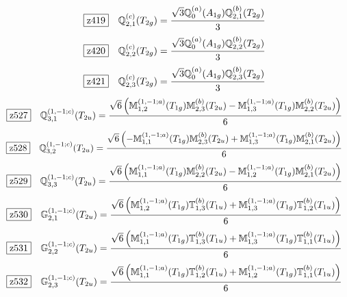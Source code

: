 \documentclass[fleqn,10pt,landscape]{jsarticle}
\begin{document}
\begin{dmath*}
\hspace*{3mm}\fbox{z419}\quad \mathbb{Q}_{2,1}^{(c)}(T_{2g})=\frac{\sqrt{3} \mathbb{Q}_{0}^{(a)}(A_{1g}) \mathbb{Q}_{2,1}^{(b)}(T_{2g})}{3}
\end{dmath*}
\begin{dmath*}
\hspace*{3mm}\fbox{z420}\quad \mathbb{Q}_{2,2}^{(c)}(T_{2g})=\frac{\sqrt{3} \mathbb{Q}_{0}^{(a)}(A_{1g}) \mathbb{Q}_{2,2}^{(b)}(T_{2g})}{3}
\end{dmath*}
\begin{dmath*}
\hspace*{3mm}\fbox{z421}\quad \mathbb{Q}_{2,3}^{(c)}(T_{2g})=\frac{\sqrt{3} \mathbb{Q}_{0}^{(a)}(A_{1g}) \mathbb{Q}_{2,3}^{(b)}(T_{2g})}{3}
\end{dmath*}
\begin{dmath*}
\hspace*{3mm}\fbox{z527}\quad \mathbb{Q}_{3,1}^{(1,-1;c)}(T_{2u})=\frac{\sqrt{6} \left(\mathbb{M}_{1,2}^{(1,-1;a)}(T_{1g}) \mathbb{M}_{2,3}^{(b)}(T_{2u}) - \mathbb{M}_{1,3}^{(1,-1;a)}(T_{1g}) \mathbb{M}_{2,2}^{(b)}(T_{2u})\right)}{6}
\end{dmath*}
\begin{dmath*}
\hspace*{3mm}\fbox{z528}\quad \mathbb{Q}_{3,2}^{(1,-1;c)}(T_{2u})=\frac{\sqrt{6} \left(- \mathbb{M}_{1,1}^{(1,-1;a)}(T_{1g}) \mathbb{M}_{2,3}^{(b)}(T_{2u}) + \mathbb{M}_{1,3}^{(1,-1;a)}(T_{1g}) \mathbb{M}_{2,1}^{(b)}(T_{2u})\right)}{6}
\end{dmath*}
\begin{dmath*}
\hspace*{3mm}\fbox{z529}\quad \mathbb{Q}_{3,3}^{(1,-1;c)}(T_{2u})=\frac{\sqrt{6} \left(\mathbb{M}_{1,1}^{(1,-1;a)}(T_{1g}) \mathbb{M}_{2,2}^{(b)}(T_{2u}) - \mathbb{M}_{1,2}^{(1,-1;a)}(T_{1g}) \mathbb{M}_{2,1}^{(b)}(T_{2u})\right)}{6}
\end{dmath*}
\begin{dmath*}
\hspace*{3mm}\fbox{z530}\quad \mathbb{G}_{2,1}^{(1,-1;c)}(T_{2u})=\frac{\sqrt{6} \left(\mathbb{M}_{1,2}^{(1,-1;a)}(T_{1g}) \mathbb{T}_{1,3}^{(b)}(T_{1u}) + \mathbb{M}_{1,3}^{(1,-1;a)}(T_{1g}) \mathbb{T}_{1,2}^{(b)}(T_{1u})\right)}{6}
\end{dmath*}
\begin{dmath*}
\hspace*{3mm}\fbox{z531}\quad \mathbb{G}_{2,2}^{(1,-1;c)}(T_{2u})=\frac{\sqrt{6} \left(\mathbb{M}_{1,1}^{(1,-1;a)}(T_{1g}) \mathbb{T}_{1,3}^{(b)}(T_{1u}) + \mathbb{M}_{1,3}^{(1,-1;a)}(T_{1g}) \mathbb{T}_{1,1}^{(b)}(T_{1u})\right)}{6}
\end{dmath*}
\begin{dmath*}
\hspace*{3mm}\fbox{z532}\quad \mathbb{G}_{2,3}^{(1,-1;c)}(T_{2u})=\frac{\sqrt{6} \left(\mathbb{M}_{1,1}^{(1,-1;a)}(T_{1g}) \mathbb{T}_{1,2}^{(b)}(T_{1u}) + \mathbb{M}_{1,2}^{(1,-1;a)}(T_{1g}) \mathbb{T}_{1,1}^{(b)}(T_{1u})\right)}{6}
\end{dmath*}
\vspace{5mm}
\end{document}
